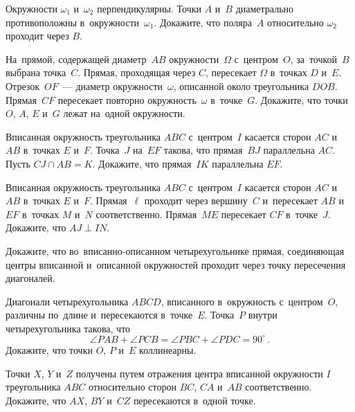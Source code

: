 



\begin{problems}

\item
Окружности $\omega_{1}$ и~$\omega_{2}$ перпендикулярны.
Точки $A$ и~$B$ диаметрально противоположны в~окружности~$\omega_{1}$.
Докажите, что поляра~$A$ относительно $\omega_{2}$ проходит через $B$.

\item
На~прямой, содержащей диаметр~$AB$ окружности~$\Omega$ с~центром~$O$,
за~точкой~$B$ выбрана точка~$C$.
Прямая, проходящая через $C$, пересекает $\Omega$ в~точках $D$ и~$E$.
Отрезок~$OF$~--- диаметр окружности~$\omega$, описанной около
треугольника $DOB$.
Прямая~$CF$ пересекает повторно окружность~$\omega$ в~точке~$G$.
Докажите, что точки $O$, $A$, $E$ и~$G$ лежат на~одной окружности.

\item
Вписанная окружность треугольника $ABC$ с~центром~$I$ касается
сторон $AC$ и~$AB$ в~точках $E$ и~$F$.
Точка~$J$ на~$EF$ такова, что прямая~$BJ$ параллельна $AC$.
Пусть $CJ \cap AB = K$.
Докажите, что прямая~$IK$ параллельна $EF$.

\item
Вписанная окружность треугольника $ABC$ с~центром~$I$ касается
сторон $AC$ и~$AB$ в~точках $E$ и~$F$.
Прямая~$\ell$ проходит через вершину~$C$ и~пересекает $AB$ и~$EF$
в~точках $M$ и~$N$ соответственно.
Прямая~$ME$ пересекает $CF$ в~точке~$J$.
Докажите, что $AJ \perp IN$.

\item
Докажите, что во~вписанно-описанном четырехугольнике прямая, соединяющая центры
вписанной и~описанной окружностей проходит через точку пересечения диагоналей.

\item
Диагонали четырехугольника $ABCD$, вписанного в~окружность с~центром~$O$,
различны по~длине и~пересекаются в~точке~$E$.
Точка~$P$ внутри четырехугольника такова, что
\[
    \angle PAB + \angle PCB = \angle PBC + \angle PDC = 90^\circ
\, . \]
Докажите, что точки $O$, $P$ и~$E$ коллинеарны.

\item
Точки $X$, $Y$ и~$Z$ получены путем отражения центра вписанной окружности $I$
треугольника $ABC$ относительно сторон $BC$, $CA$ и~$AB$ соответственно.
Докажите, что $AX$, $BY$ и~$CZ$ пересекаются в~одной точке.


\end{problems}

